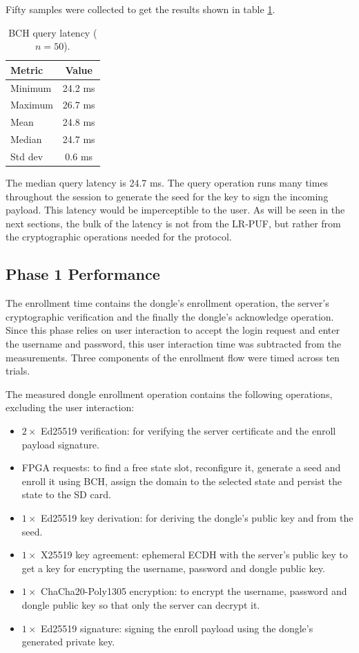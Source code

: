 Fifty samples were collected to get the results shown in table \ref{tab:perf-bch-query}.

\begin{table}[ht!]
\centering
\caption{BCH query latency ($n=50$).}
\begin{tabular}{lc}
\hline
\textbf{Metric} & \textbf{Value} \\
\hline
Minimum      & 24.2 ms \\
Maximum      & 26.7 ms \\
Mean         & 24.8 ms \\
Median       & 24.7 ms \\
Std dev  &  0.6 ms \\
\hline
\end{tabular}
\label{tab:perf-bch-query}
\end{table}

The median query latency is 24.7 ms. The query operation runs many times throughout the session to generate the seed for the key to sign the incoming payload. This latency would be imperceptible to the user. As will be seen in the next sections, the bulk of the latency is not from the LR-PUF, but rather from the cryptographic operations needed for the protocol.

\subsection{Phase 1 Performance}

The enrollment time contains the dongle's enrollment operation, the server's cryptographic verification and the finally the dongle's acknowledge operation. Since this phase relies on user interaction to accept the login request and enter the username and password, this user interaction time was subtracted from the measurements. Three components of the enrollment flow were timed across ten trials.

The measured dongle enrollment operation contains the following operations, excluding the user interaction:
\begin{itemize}
    \item $2\times$ Ed25519 verification: for verifying the server certificate and the enroll payload signature.
    \item FPGA requests: to find a free state slot, reconfigure it, generate a seed and enroll it using BCH, assign the domain to the selected state and persist the state to the SD card.
    \item $1\times$ Ed25519 key derivation: for deriving the dongle's public key and from the seed.
    \item $1\times$ X25519 key agreement: ephemeral ECDH with the server's public key to get a key for encrypting the username, password and dongle public key.
    \item $1\times$ ChaCha20-Poly1305 encryption: to encrypt the username, password and dongle public key so that only the server can decrypt it.
    \item $1\times$ Ed25519 signature: signing the enroll payload using the dongle's generated private key.
\end{itemize}

